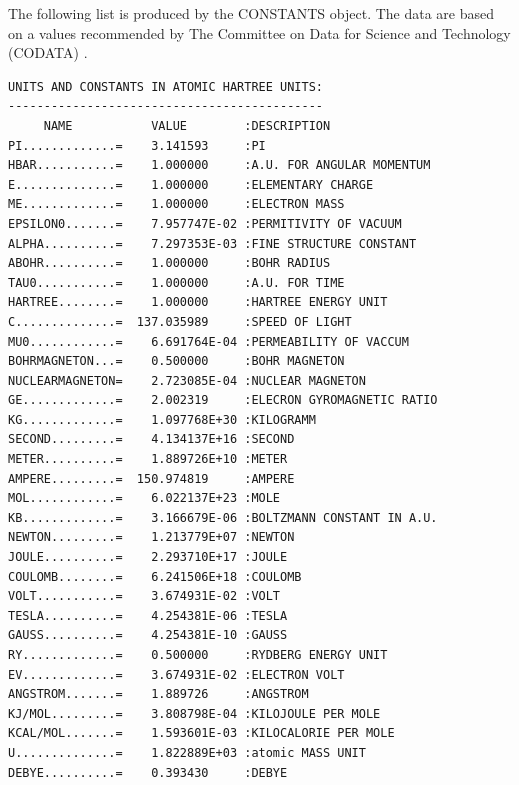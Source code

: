 \documentclass[final,12pt]{article}
\begin{document}
{{{{{{The following list is produced by the CONSTANTS object.  The data are
based on a values recommended by The Committee on Data for Science and
Technology (CODATA) \cite{mohr00_rmp72_351}.
\begin{verbatim}
UNITS AND CONSTANTS IN ATOMIC HARTREE UNITS:
--------------------------------------------
     NAME           VALUE        :DESCRIPTION
PI.............=    3.141593     :PI
HBAR...........=    1.000000     :A.U. FOR ANGULAR MOMENTUM
E..............=    1.000000     :ELEMENTARY CHARGE
ME.............=    1.000000     :ELECTRON MASS
EPSILON0.......=    7.957747E-02 :PERMITIVITY OF VACUUM
ALPHA..........=    7.297353E-03 :FINE STRUCTURE CONSTANT
ABOHR..........=    1.000000     :BOHR RADIUS
TAU0...........=    1.000000     :A.U. FOR TIME
HARTREE........=    1.000000     :HARTREE ENERGY UNIT
C..............=  137.035989     :SPEED OF LIGHT
MU0............=    6.691764E-04 :PERMEABILITY OF VACCUM
BOHRMAGNETON...=    0.500000     :BOHR MAGNETON
NUCLEARMAGNETON=    2.723085E-04 :NUCLEAR MAGNETON
GE.............=    2.002319     :ELECRON GYROMAGNETIC RATIO
KG.............=    1.097768E+30 :KILOGRAMM      
SECOND.........=    4.134137E+16 :SECOND     
METER..........=    1.889726E+10 :METER
AMPERE.........=  150.974819     :AMPERE           
MOL............=    6.022137E+23 :MOLE
KB.............=    3.166679E-06 :BOLTZMANN CONSTANT IN A.U.
NEWTON.........=    1.213779E+07 :NEWTON
JOULE..........=    2.293710E+17 :JOULE
COULOMB........=    6.241506E+18 :COULOMB
VOLT...........=    3.674931E-02 :VOLT
TESLA..........=    4.254381E-06 :TESLA
GAUSS..........=    4.254381E-10 :GAUSS
RY.............=    0.500000     :RYDBERG ENERGY UNIT
EV.............=    3.674931E-02 :ELECTRON VOLT
ANGSTROM.......=    1.889726     :ANGSTROM
KJ/MOL.........=    3.808798E-04 :KILOJOULE PER MOLE
KCAL/MOL.......=    1.593601E-03 :KILOCALORIE PER MOLE
U..............=    1.822889E+03 :atomic MASS UNIT 
DEBYE..........=    0.393430     :DEBYE



\end{verbatim}}}}}}}
\end{document}
